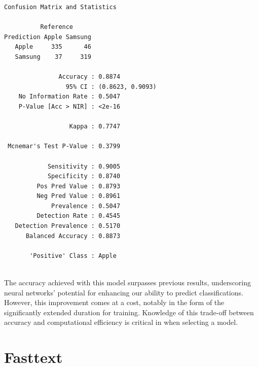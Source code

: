\begin{Shaded}
\begin{Highlighting}[]
\OtherTok{\textless{}{-}} 

\SpecialCharTok{$}
\end{Highlighting}
\end{Shaded}

\begin{verbatim}
Confusion Matrix and Statistics

          Reference
Prediction Apple Samsung
   Apple     335      46
   Samsung    37     319
                                          
               Accuracy : 0.8874          
                 95% CI : (0.8623, 0.9093)
    No Information Rate : 0.5047          
    P-Value [Acc > NIR] : <2e-16          
                                          
                  Kappa : 0.7747          
                                          
 Mcnemar's Test P-Value : 0.3799          
                                          
            Sensitivity : 0.9005          
            Specificity : 0.8740          
         Pos Pred Value : 0.8793          
         Neg Pred Value : 0.8961          
             Prevalence : 0.5047          
         Detection Rate : 0.4545          
   Detection Prevalence : 0.5170          
      Balanced Accuracy : 0.8873          
                                          
       'Positive' Class : Apple           
                                          
\end{verbatim}

The accuracy achieved with this model surpasses previous results,
underscoring neural networks' potential for enhancing our ability to predict classifications. However, this improvement comes at a cost, notably in the
form of the significantly extended duration for training. Knowledge of this trade-off
between accuracy and computational efficiency is critical in when selecting a model.

\section{Fasttext}\label{fasttext}

